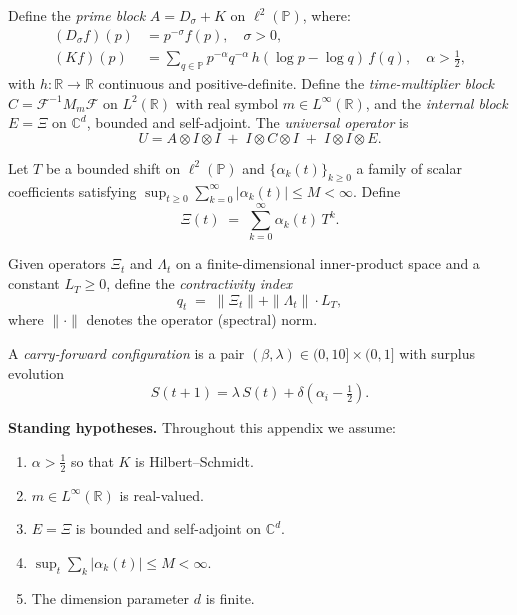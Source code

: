 \documentclass[11pt]{article}
\begin{document}
\begin{definition}
\label{def:U}
Define the \emph{prime block}
$A = D_{\sigma}+K$ on $\ell^{2}(\mathbb{P})$,
where:
\begin{align}
(D_{\sigma}f)(p) &= p^{-\sigma}f(p), \quad \sigma>0, \\
(Kf)(p) &= \sum_{q\in\mathbb{P}} p^{-\alpha}q^{-\alpha}\,h(\log p - \log q)\,f(q),
\quad \alpha>\tfrac{1}{2},
\end{align}
with $h:\mathbb{R}\to\mathbb{R}$ continuous and positive-definite.
Define the \emph{time-multiplier block}
$C = \mathcal{F}^{-1}M_{m}\mathcal{F}$ on $L^{2}(\mathbb{R})$
with real symbol $m\in L^{\infty}(\mathbb{R})$,
and the \emph{internal block} $E=\Xi$ on $\mathbb{C}^{d}$,
bounded and self-adjoint.
The \emph{universal operator} is
\[
U = A\otimes I\otimes I \;+\; I\otimes C\otimes I \;+\; I\otimes I\otimes E.
\]
\end{definition}

\begin{definition}
\label{def:Xi}
Let $T$ be a bounded shift on $\ell^{2}(\mathbb{P})$
and $\{\alpha_{k}(t)\}_{k\geq 0}$ a family of scalar
coefficients satisfying
$\sup_{t\geq 0}\sum_{k=0}^{\infty}|\alpha_{k}(t)|\leq M<\infty$.
Define
\[
\Xi(t) \;=\; \sum_{k=0}^{\infty}\alpha_{k}(t)\,T^{k}.
\]
\end{definition}

\begin{definition}
\label{def:qt}
Given operators $\Xi_{t}$ and $\Lambda_{t}$ on a
finite-dimensional inner-product space and a constant
$L_{T}\geq 0$, define the \emph{contractivity index}
\[
q_{t} \;=\; \|\Xi_{t}\| + \|\Lambda_{t}\|\cdot L_{T},
\]
where $\|\cdot\|$ denotes the operator (spectral) norm.
\end{definition}

\begin{definition}
\label{def:cfp}
A \emph{carry-forward configuration} is a pair
$(\beta,\lambda)\in(0,10]\times(0,1]$
with surplus evolution
\[
S(t+1) = \lambda\,S(t) + \delta\!\left(\alpha_i - \tfrac{1}{2}\right).
\]
\end{definition}

\noindent\textbf{Standing hypotheses.}
Throughout this appendix we assume:
\begin{enumerate}[label=(H\arabic*)]
\item $\alpha > \tfrac{1}{2}$ so that $K$ is Hilbert--Schmidt.
\item $m\in L^{\infty}(\mathbb{R})$ is real-valued.
\item $E=\Xi$ is bounded and self-adjoint on $\mathbb{C}^{d}$.
\item $\sup_{t}\sum_{k}|\alpha_{k}(t)| \leq M < \infty$.
\item The dimension parameter $d$ is finite.
\end{enumerate}
\end{document}
